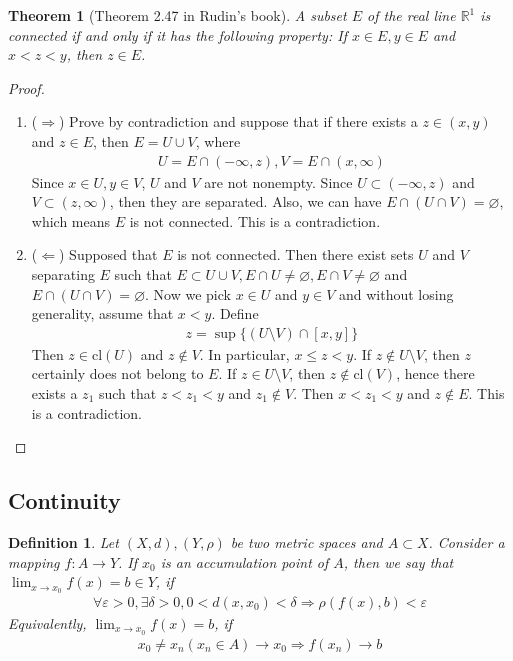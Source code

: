 \documentclass[12pt,leqno]{amsart}
\newtheorem{definition}{Definition}[section]
\newtheorem{theorem}{Theorem}[section]
\theoremstyle{definition}
\numberwithin{equation}{subsection}
\begin{document}
\newpage
\begin{theorem}[Theorem 2.47 in Rudin's book]
A subset $E$ of the real line $\mathbb{R}^1$ is connected if and only if it has the following property: If $x\in E, y\in E$ and $x<z<y$, then $z\in E$.
\end{theorem}
\begin{proof}
~\begin{enumerate}
    \item ($\Rightarrow$) Prove by contradiction and suppose that if there exists a $z\in (x,y)$ and $z\in E$, then $E = U\cup V$, where 
    \begin{align*}
        U = E\cap (-\infty,z), V = E\cap(x,\infty)
    \end{align*}
    Since $x\in U, y\in V$, $U$ and $V$ are not nonempty. Since $U\subset (-\infty, z)$ and $V\subset (z,\infty)$, then they are separated. Also, we can have $E\cap(U\cap V) = \varnothing$, which means $E$ is not connected. This is a contradiction.
    \item ($\Leftarrow$) Supposed that $E$ is not connected. Then there exist sets $U$ and $V$ separating $E$ such that $E\subset U\cup V, E\cap U\neq\varnothing, E\cap V\neq\varnothing$ and $E\cap(U\cap V) = \varnothing$. Now we pick $x\in U$ and $y\in V$ and without losing generality, assume that $x < y$. Define 
    \begin{align*}
        z = \sup\{(U\setminus V)\cap[x,y]\}
    \end{align*}
    Then $z\in \text{cl}(U)$ and $z\notin V$. In particular, $x\leq z < y$. If $z\notin U\setminus V$, then $z$ certainly does not belong to $E$. If $z\in U\setminus V$, then $z\notin \text{cl}(V)$, hence there exists a $z_1$ such that $z<z_1<y$ and $z_1\notin V$. Then $x<z_1<y$ and $z\notin E$. This is a contradiction.
\end{enumerate}
\end{proof}


\medskip

\subsection{Continuity}
\begin{definition}
Let $(X,d), (Y,\rho)$ be two metric spaces and $A\subset X$. Consider a mapping $f:A\to Y$. If $x_0$ is an accumulation point of $A$, then we say that $\lim_{x\to x_0}f(x) = b \in Y$, if 
\begin{align*}
    \forall\varepsilon>0, \exists\delta>0, 0<d(x,x_0)<\delta \Rightarrow \rho(f(x),b)<\varepsilon
\end{align*}
Equivalently, $\lim_{x\to x_0}f(x) = b$, if
\begin{align*}
    x_0 \neq x_n (x_n\in A) \to x_0 \Rightarrow f(x_n) \to b
\end{align*}
\end{definition}
\end{document}
